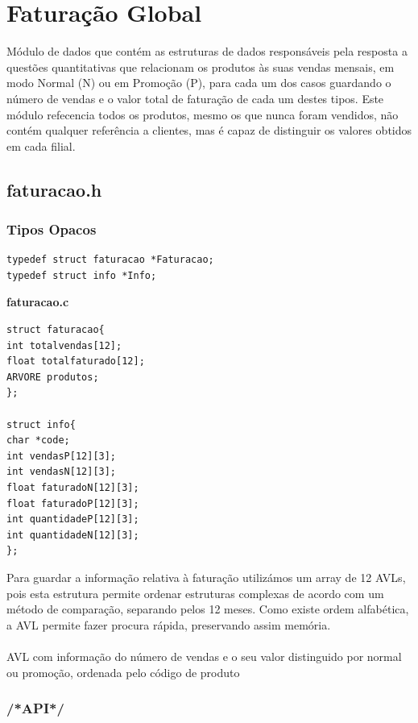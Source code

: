 \section{Faturação Global}

Módulo de dados que contém as estruturas de dados responsáveis pela resposta a questões quantitativas que relacionam os produtos às suas vendas mensais, em modo Normal (N) ou em Promoção (P), para cada um dos casos guardando o número de vendas e o valor total de faturação de cada um destes tipos. Este módulo refecencia todos os produtos, mesmo os que nunca foram vendidos, não contém qualquer referência a clientes, mas é capaz de distinguir os valores obtidos em cada filial. 

\subsection{faturacao.h}

\subsubsection{Tipos Opacos}
\begin{Verbatim}
typedef struct faturacao *Faturacao;
typedef struct info *Info;
\end{Verbatim}

\textbf{faturacao.c}
\begin{verbatim}
struct faturacao{
int totalvendas[12];
float totalfaturado[12];
ARVORE produtos;
};

struct info{
char *code;
int vendasP[12][3];
int vendasN[12][3];
float faturadoN[12][3];
float faturadoP[12][3];
int quantidadeP[12][3];
int quantidadeN[12][3];
};
\end{verbatim}

Para guardar a informação relativa à faturação utilizámos um array de 12 AVLs, pois esta estrutura permite ordenar estruturas complexas de acordo com um método de comparação, separando pelos 12 meses. Como existe ordem alfabética, a AVL permite fazer procura rápida, preservando assim memória. 

\paragraph{}
AVL com informação do número de vendas e o seu valor distinguido por normal ou promoção, ordenada pelo código de produto

\subsubsection{/*API*/}

